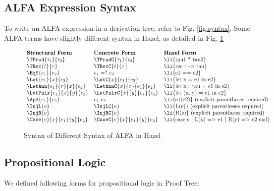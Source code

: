 \subsection{ALFA Expression Syntax}\label{alfa-expression-forms}

To write an ALFA expression in a derivation tree, refer to Fig. \ref{fig:syntax}. Some ALFA terms have slightly different syntax in Hazel, as detailed in Fig. \ref{fig:hazel-alfa-syntax}

\begin{figure}[ht]
\[\begin{array}{lll}
\textbf{Structural Form} & \textbf{Concrete Form} & \textbf{Hazel Form} \\
\TProd{\tau_1}{\tau_2} & \TProdC{\tau_1}{\tau_2} & \text{\li{tau1 * tau2}} \\
\TRec{t}{\tau} & \TRecC{t}{\tau} & \text{\li{rec t -> tau}} \\
\EqS{e_1}{e_2} & e_1 =?\ e_2 & \text{\li{e1 == e2}} \\
\Let{e_1}{x}{e_2} & \LetC{x}{e_1}{e_2} & \text{\li{let x = e1 in e2}}\\
\LetAnn{e_1}{\tau}{x}{e_2} & \LetAnnC{x}{\tau}{e_1}{e_2} & \text{\li{let x : tau = e1 in e2}} \\
\LetPair{e_1}{x}{y}{e_2} & \LetPairC{x}{y}{e_1}{e_2} & \text{\li{let (x, y) = e1 in e2}} \\
\ApS{e_1}{e_2} & e_1\ e_2 & \text{\li{e1(e2)} (explicit parentheses required)} \\
\InjL{e} & \InjLC{e} & \text{\li{L(e)} (explicit parentheses required)} \\
\InjR{e} & \InjRC{e} & \text{\li{R(e)} (explicit parentheses required)} \\
\Case{e}{x}{e_1}{y}{e_2} & \CaseC{e}{x}{e_1}{y}{e_2} & \text{\li{case e | L(x) => e1 | R(y) => e2 end}} \\
\end{array}\]
\vspace{-10px}
\caption{Syntax of Different Syntax of ALFA in Hazel}
\label{fig:hazel-alfa-syntax}
\end{figure}

\subsection{Propositional Logic}\label{propositional-logic}

We defined following forms for propositional logic in Proof Tree:

